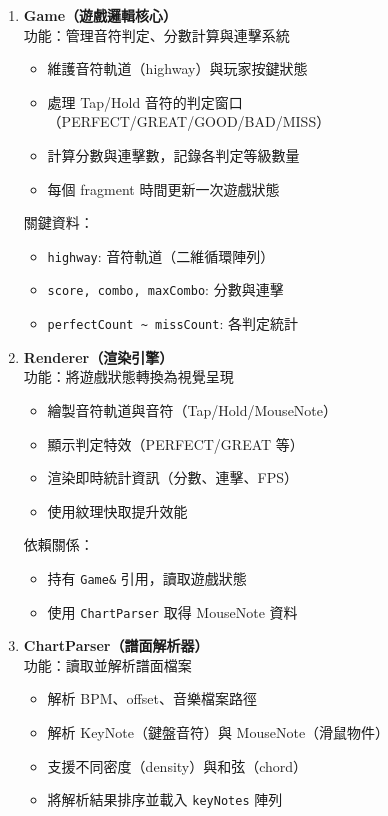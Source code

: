 \documentclass[a4paper,12pt]{article}
\begin{document}
\begin{enumerate}
  \item \textbf{Game（遊戲邏輯核心）} \\
  功能：管理音符判定、分數計算與連擊系統
  \begin{itemize}
    \item 維護音符軌道（highway）與玩家按鍵狀態
    \item 處理 Tap/Hold 音符的判定窗口（PERFECT/GREAT/GOOD/BAD/MISS）
    \item 計算分數與連擊數，記錄各判定等級數量
    \item 每個 fragment 時間更新一次遊戲狀態
  \end{itemize}
  關鍵資料：
  \begin{itemize}
    \item \verb|highway|: 音符軌道（二維循環陣列）
    \item \verb|score, combo, maxCombo|: 分數與連擊
    \item \verb|perfectCount ~ missCount|: 各判定統計
  \end{itemize}
  \item \textbf{Renderer（渲染引擎）} \\
  功能：將遊戲狀態轉換為視覺呈現
  \begin{itemize}
    \item 繪製音符軌道與音符（Tap/Hold/MouseNote）
    \item 顯示判定特效（PERFECT/GREAT 等）
    \item 渲染即時統計資訊（分數、連擊、FPS）
    \item 使用紋理快取提升效能
  \end{itemize}
  依賴關係：
  \begin{itemize}
    \item 持有 \verb|Game&| 引用，讀取遊戲狀態
    \item 使用 \verb|ChartParser| 取得 MouseNote 資料
  \end{itemize}
  \item \textbf{ChartParser（譜面解析器）} \\
  功能：讀取並解析譜面檔案
  \begin{itemize}
    \item 解析 BPM、offset、音樂檔案路徑
    \item 解析 KeyNote（鍵盤音符）與 MouseNote（滑鼠物件）
    \item 支援不同密度（density）與和弦（chord）
    \item 將解析結果排序並載入 \verb|keyNotes| 陣列
  \end{itemize}

\end{enumerate}
\end{document}

